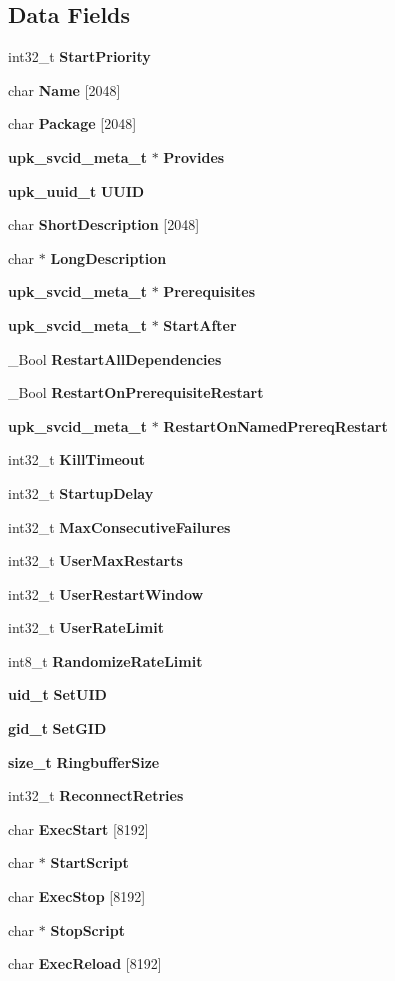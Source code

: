 \subsection*{Data Fields}
\begin{DoxyCompactItemize}
\item 
int32\_\-t {\bf StartPriority}
\item 
char {\bf Name} [2048]
\item 
char {\bf Package} [2048]
\item 
{\bf upk\_\-svcid\_\-meta\_\-t} $\ast$ {\bf Provides}
\item 
{\bf upk\_\-uuid\_\-t} {\bf UUID}
\item 
char {\bf ShortDescription} [2048]
\item 
char $\ast$ {\bf LongDescription}
\item 
{\bf upk\_\-svcid\_\-meta\_\-t} $\ast$ {\bf Prerequisites}
\item 
{\bf upk\_\-svcid\_\-meta\_\-t} $\ast$ {\bf StartAfter}
\item 
\_\-Bool {\bf RestartAllDependencies}
\item 
\_\-Bool {\bf RestartOnPrerequisiteRestart}
\item 
{\bf upk\_\-svcid\_\-meta\_\-t} $\ast$ {\bf RestartOnNamedPrereqRestart}
\item 
int32\_\-t {\bf KillTimeout}
\item 
int32\_\-t {\bf StartupDelay}
\item 
int32\_\-t {\bf MaxConsecutiveFailures}
\item 
int32\_\-t {\bf UserMaxRestarts}
\item 
int32\_\-t {\bf UserRestartWindow}
\item 
int32\_\-t {\bf UserRateLimit}
\item 
int8\_\-t {\bf RandomizeRateLimit}
\item 
{\bf uid\_\-t} {\bf SetUID}
\item 
{\bf gid\_\-t} {\bf SetGID}
\item 
{\bf size\_\-t} {\bf RingbufferSize}
\item 
int32\_\-t {\bf ReconnectRetries}
\item 
char {\bf ExecStart} [8192]
\item 
char $\ast$ {\bf StartScript}
\item 
char {\bf ExecStop} [8192]
\item 
char $\ast$ {\bf StopScript}
\item 
char {\bf ExecReload} [8192]
\item 

\end{DoxyCompactItemize}

